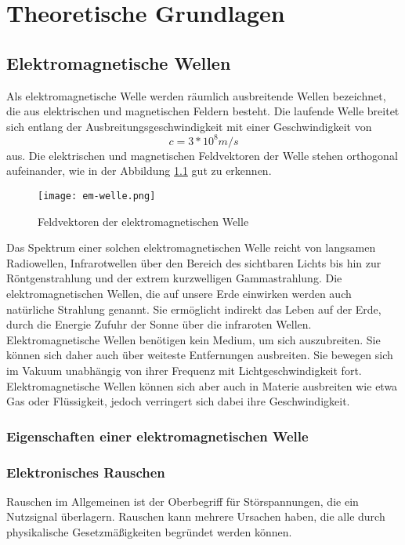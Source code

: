 
\chapter{Theoretische Grundlagen}
\section{Elektromagnetische Wellen}

Als elektromagnetische Welle werden räumlich ausbreitende Wellen bezeichnet, die aus elektrischen und magnetischen Feldern besteht. Die laufende Welle breitet sich entlang der Ausbreitungsgeschwindigkeit mit einer Geschwindigkeit von \[c= 3*10^8 m/s\] aus. Die elektrischen und magnetischen Feldvektoren der Welle stehen orthogonal aufeinander, wie in der Abbildung \ref{elektromagnetische Welle} gut zu erkennen.

\begin{figure}[ht]
	\centering
	\texttt{[image: em-welle.png]}
	\caption[Feldvektoren der elektromagnetischen Welle]{Feldvektoren der elektromagnetischen Welle} 
	\label{elektromagnetische Welle}
\end{figure}

Das Spektrum einer solchen elektromagnetischen Welle reicht von langsamen Radiowellen, Infrarotwellen über den Bereich des sichtbaren Lichts bis hin zur Röntgenstrahlung und der extrem kurzwelligen Gammastrahlung.
Die elektromagnetischen Wellen, die auf unsere Erde einwirken werden auch natürliche Strahlung genannt. Sie ermöglicht indirekt das Leben auf der Erde, durch die Energie Zufuhr der Sonne über die infraroten Wellen.
Elektromagnetische Wellen benötigen kein Medium, um sich auszubreiten. Sie können sich daher auch über weiteste Entfernungen ausbreiten. Sie bewegen sich im Vakuum unabhängig von ihrer Frequenz mit Lichtgeschwindigkeit fort. Elektromagnetische Wellen können sich aber auch in Materie ausbreiten wie etwa Gas oder Flüssigkeit, jedoch verringert sich dabei ihre Geschwindigkeit.

\subsection{Eigenschaften einer elektromagnetischen Welle}

\subsection{Elektronisches Rauschen}
Rauschen im Allgemeinen ist der Oberbegriff für Störspannungen, die ein Nutzsignal überlagern. Rauschen kann mehrere Ursachen haben, die alle durch physikalische Gesetzmäßigkeiten begründet werden können. 


